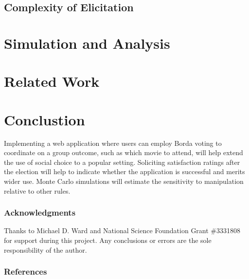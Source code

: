 \documentclass[12pt,letterpaper]{article} %
\begin{document}
\subsection{Complexity of Elicitation}


\section{Simulation and Analysis}




\section{Related Work}

\section{Conclustion}

Implementing a web application where users can employ Borda voting to coordinate on a group outcome, such as which movie to attend, will help extend the use of social choice to a popular setting. Soliciting satisfaction ratings after the election will help to indicate whether the application is successful and merits wider use. Monte Carlo simulations will estimate the sensitivity to manipulation relative to other rules. 



\subsubsection*{Acknowledgments}

Thanks to Michael D. Ward and National Science Foundation Grant \#3331808 for support during this project. Any conclusions or errors are the sole responsibility of the author.

\newpage
\subsubsection*{References}



\begingroup
\renewcommand{\section}[2]{}


\endgroup
\end{document}
